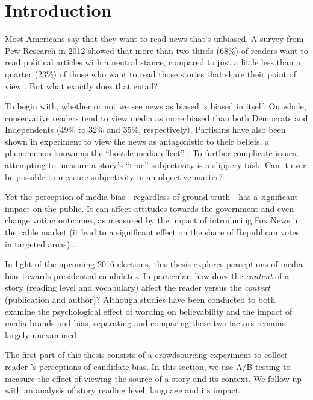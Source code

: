 \chapter{Introduction}
 Most Americans say that they want to read news that's unbiased. A survey from Pew Research in 2012 showed that more than two-thirds (68\%) of readers want to read political articles with a neutral stance, compared to just a little less than a quarter (23\%) of those who want to read those stories that share their point of view \cite{Pew-bias-2012}. But what exactly does that entail?

To begin with, whether or not we see news as biased is biased in itself. On whole, conservative readers tend to view media as more biased than both Democrats and Independents (49\% to 32\% and 35\%, respectively)\cite{Pew-bias-2012}. Partisans have also been shown in experiment to view the news as antagonistic to their beliefs, a phenomenon known as the ``hostile media effect'' \cite{vallone1985hostile}. To further complicate issues, attempting to measure a story's ``true'' subjectivity is a slippery task. Can it ever be possible to measure subjectivity in an objective matter?
 
Yet the perception of media bias---regardless of ground truth---has a significant impact on the public. It can affect attitudes towards the government and even change voting outcomes, as measured by the impact of introducing Fox News in the cable market (it lead to a significant effect on the share of Republican votes in targeted areas) \cite{dellavigna2006fox}.

In light of the upcoming 2016 elections, this thesis explores perceptions of media bias towards presidential candidates. In particular, how does the \emph{content} of a story (reading level and vocabulary) affect the reader versus the \emph{context} (publication and author)? Although studies have been conducted to both examine the psychological effect of wording on believability and the impact of media brands and bias, separating and comparing these two factors remains largely unexamined \cite{weisberg2008seductive, baum2008eye}

The first part of this thesis consists of a crowdsourcing experiment to collect reader
's perceptions of candidate bias. In this section, we use A/B testing to measure the effect of viewing the source of a story and its context. We follow up with an analysis of story reading level, language and its impact.
 